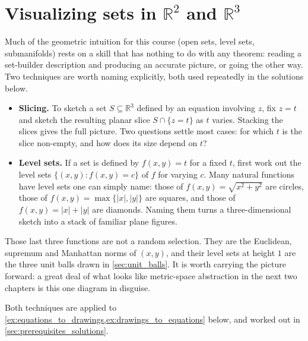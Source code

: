 \section{Visualizing sets in \texorpdfstring{$\mathbb{R}^2$}{R2} and \texorpdfstring{$\mathbb{R}^3$}{R3}}
\label{sec:visualizing_sets}

Much of the geometric intuition for this course (open sets, level sets, submanifolds) rests on a
skill that has nothing to do with any theorem: reading a set-builder description and producing an
accurate picture, or going the other way. Two techniques are worth naming explicitly, both used
repeatedly in the solutions below.

\begin{itemize}
  \item \textbf{Slicing.} To sketch a set $S \subseteq \mathbb{R}^3$ defined by an equation
    involving $z$, fix $z = t$ and sketch the resulting planar slice $S \cap \{z = t\}$ as $t$
    varies. Stacking the slices gives the full picture. Two questions settle most cases: for which
    $t$ is the slice non-empty, and how does its size depend on $t$?
  \item \textbf{Level sets.} If a set is defined by $f(x,y) = t$ for a fixed $t$, first work out
    the level sets $\{(x,y) : f(x,y) = c\}$ of $f$ for varying $c$. Many natural functions have
    level sets one can simply name: those of $f(x,y) = \sqrt{x^2+y^2}$ are circles, those of
    $f(x,y) = \max\{|x|,|y|\}$ are squares, and those of $f(x,y) = |x|+|y|$ are diamonds. Naming
    them turns a three-dimensional sketch into a stack of familiar plane figures.
\end{itemize}

Those last three functions are not a random selection. They are the Euclidean, supremum and
Manhattan norms of $(x,y)$, and their level sets at height $1$ are the three unit balls drawn in
\cref{sec:unit_balls}. It is worth carrying the picture forward: a great deal of what looks like
metric-space abstraction in the next two chapters is this one diagram in disguise.

Both techniques are applied to \cref{ex:equations_to_drawings,ex:drawings_to_equations} below, and worked out in
\cref{sec:prerequisites_solutions}.

